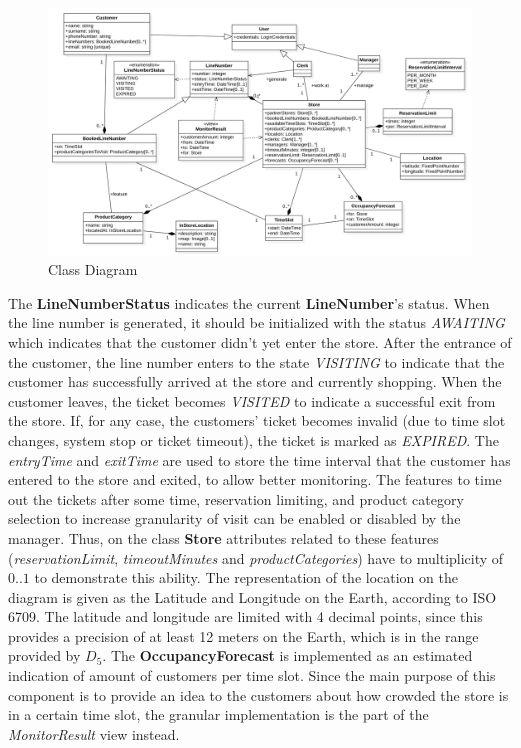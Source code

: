 \begin{figure}[H]
    \centering
    \includegraphics[height=0.4\textwidth]{Images/ClassDiagram.png}
    \caption{Class Diagram}
    \label{fig:ClassDiagram}
\end{figure}

The \textbf{LineNumberStatus} indicates the current \textbf{LineNumber}'s status.
When the line number is generated, it should be initialized with the status \textit{AWAITING} which indicates that the customer didn't yet enter the store.
After the entrance of the customer, the line number enters to the state \textit{VISITING} to indicate that the customer has successfully arrived at the store and currently shopping.
When the customer leaves, the ticket becomes \textit{VISITED} to indicate a successful exit from the store.
If, for any case, the customers' ticket becomes invalid (due to time slot changes, system stop or ticket timeout), the ticket is marked as \textit{EXPIRED}.
The \textit{entryTime} and \textit{exitTime} are used to store the time interval that the customer has entered to the store and exited, to allow better monitoring.
The features to time out the tickets after some time, reservation limiting, and product category selection to increase granularity of visit can be enabled or disabled by the manager.
Thus, on the class \textbf{Store} attributes related to these features (\textit{reservationLimit}, \textit{timeoutMinutes} and \textit{productCategories}) have to multiplicity of $0..1$ to demonstrate this ability.
The representation of the location on the diagram is given as the Latitude and Longitude on the Earth, according to ISO 6709.
The latitude and longitude are limited with 4 decimal points, since this provides a precision of at least 12 meters on the Earth, which is in the range provided by $D_{5}$.
The \textbf{OccupancyForecast} is implemented as an estimated indication of amount of customers per time slot.
Since the main purpose of this component is to provide an idea to the customers about how crowded the store is in a certain time slot, the granular implementation is the part of the \textit{MonitorResult} view instead.
